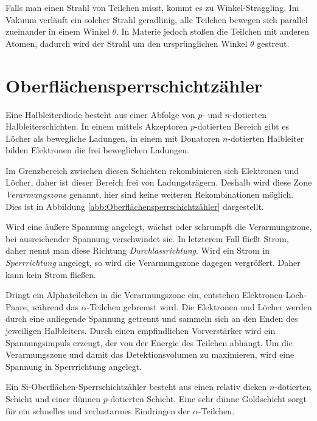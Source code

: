 \documentclass[12pt,a4paper]{scrartcl}
\numberwithin{equation}{section} %
\renewcommand{\[}{} %
\renewcommand{\]}{\noindent} %
\begin{document}
Falls man einen Strahl von Teilchen misst, kommt es zu
Winkel-Straggling. Im Vakuum verläuft ein solcher Strahl geradlinig,
alle Teilchen bewegen sich parallel zueinander in einem Winkel
\(\theta\). In Materie jedoch stoßen die Teilchen mit anderen Atomen,
dadurch wird der Strahl um den ursprünglichen Winkel \(\theta\)
gestreut.

\hypertarget{oberfluxe4chensperrschichtzuxe4hler}{%
\section{Oberflächensperrschichtzähler}\label{oberfluxe4chensperrschichtzuxe4hler}}

Eine Halbleiterdiode besteht aus einer Abfolge von \(p\)- und
\(n\)-dotierten Halbleiterschichten. In einem mittels Akzeptoren
\(p\)-dotierten Bereich gibt es Löcher als bewegliche Ladungen, in einem
mit Donatoren \(n\)-dotierten Halbleiter bilden Elektronen die frei
beweglichen Ladungen.

Im Grenzbereich zwischen diesen Schichten rekombinieren sich Elektronen
und Löcher, daher ist dieser Bereich frei von Ladungsträgern. Deshalb
wird diese Zone \emph{Verarmungszone} genannt, hier sind keine weiteren
Rekombinationen möglich. Dies ist in Abbildung \ref{abb:Oberflächensperrschichtzähler} dargestellt.

Wird eine äußere Spannung angelegt, wächst oder schrumpft die
Verarmungszone, bei ausreichender Spannung verschwindet sie. In
letzterem Fall fließt Strom, daher nennt man diese Richtung
\emph{Durchlassrichtung}. Wird ein Strom in \emph{Sperrrichtung}
angelegt, so wird die Verarmungszone dagegen vergrößert. Daher kann kein
Strom fließen.

Dringt ein Alphateilchen in die Verarmungszone ein, entstehen
Elektronen-Loch-Paare, während das \(\alpha\)-Teilchen gebremst wird.
Die Elektronen und Löcher werden durch eine anliegende Spannung getrennt
und sammeln sich an den Enden des jeweiligen Halbleiters. Durch einen
empfindlichen Vorverstärker wird ein Spannungsimpuls erzeugt, der von
der Energie des Teilchen abhängt. Um die Verarmungszone und damit das
Detektionsvolumen zu maximieren, wird eine Spannung in Sperrrichtung
angelegt.

Ein \(\mathrm{Si}\)-Oberflächen-Sperrschichtzähler besteht aus einen
relativ dicken \(n\)-dotierten Schicht und einer dünnen \(p\)-dotierten
Schicht. Eine sehr dünne Goldschicht sorgt für ein schnelles und
verlustarmes Eindringen der \(\alpha\)-Teilchen.
\end{document}

